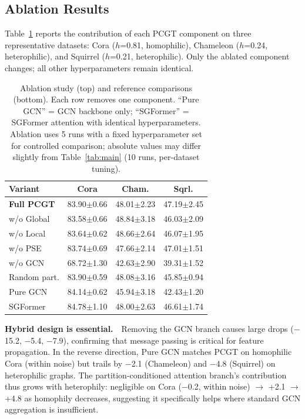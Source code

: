 \documentclass[sigconf]{acmart}
\begin{document}
\subsection{Ablation Results}
\label{sec:ablation_results}

Table~\ref{tab:ablation} reports the contribution of each PCGT component on three representative datasets: Cora ($h$=0.81, homophilic), Chameleon ($h$=0.24, heterophilic), and Squirrel ($h$=0.21, heterophilic). Only the ablated component changes; all other hyperparameters remain identical.

\begin{table}[t]
\centering
\small
{
\begin{tabular}{l|ccc}
\toprule
\textbf{Variant} & \textbf{Cora} & \textbf{Cham.} & \textbf{Sqrl.} \\
\midrule
\textbf{Full PCGT} & 83.90{\scriptsize$\pm$0.66} & 48.01{\scriptsize$\pm$2.23} & 47.19{\scriptsize$\pm$2.45} \\
\midrule
w/o Global & 83.58{\scriptsize$\pm$0.66} & 48.84{\scriptsize$\pm$3.18} & 46.03{\scriptsize$\pm$2.09} \\
w/o Local & 83.64{\scriptsize$\pm$0.62} & 48.66{\scriptsize$\pm$2.64} & 46.07{\scriptsize$\pm$1.95} \\
w/o PSE & 83.74{\scriptsize$\pm$0.69} & 47.66{\scriptsize$\pm$2.14} & 47.01{\scriptsize$\pm$1.51} \\
w/o GCN & 68.72{\scriptsize$\pm$1.30} & 42.63{\scriptsize$\pm$2.90} & 39.31{\scriptsize$\pm$1.52} \\
Random part. & 83.90{\scriptsize$\pm$0.59} & 48.08{\scriptsize$\pm$3.16} & 45.85{\scriptsize$\pm$0.94} \\
\midrule
Pure GCN & 84.14{\scriptsize$\pm$0.62} & 45.94{\scriptsize$\pm$3.18} & 42.43{\scriptsize$\pm$1.20} \\
SGFormer & 84.78{\scriptsize$\pm$1.10} & 48.00{\scriptsize$\pm$2.63} & 46.61{\scriptsize$\pm$1.74} \\
\bottomrule
\end{tabular}
}
\caption{Ablation study (top) and reference comparisons (bottom). Each row removes one component. ``Pure GCN'' = GCN backbone only; ``SGFormer'' = SGFormer attention with identical hyperparameters. Ablation uses 5 runs with a fixed hyperparameter set for controlled comparison; absolute values may differ slightly from Table~\ref{tab:main} (10 runs, per-dataset tuning).}
\label{tab:ablation}
\end{table}

\textbf{Hybrid design is essential.}~~Removing the GCN branch causes large drops ($-$15.2, $-$5.4, $-$7.9), confirming that message passing is critical for feature propagation. In the reverse direction, Pure GCN matches PCGT on homophilic Cora (within noise) but trails by $-$2.1 (Chameleon) and $-$4.8 (Squirrel) on heterophilic graphs. The partition-conditioned attention branch's contribution thus grows with heterophily: negligible on Cora ($-$0.2, within noise) $\to$ +2.1 $\to$ +4.8 as homophily decreases, suggesting it specifically helps where standard GCN aggregation is insufficient.
\end{document}
